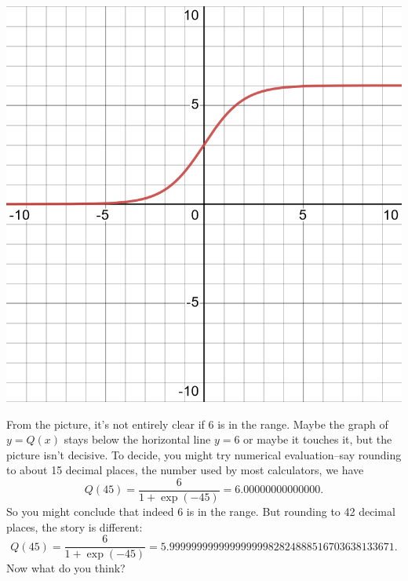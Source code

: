 \documentclass[12pt,fleqn,answers]{exam}
\begin{document}
\begin{questions}
\begin{solution}[3.5in]
\begin{center}
\includegraphics[scale=0.15]{desmos-graph(26).png}
\end{center}
From the picture, it's not entirely clear if $6$ is in the range. Maybe the graph of $y=Q(x)$ stays below the horizontal line
$y=6$ or maybe it touches it, but the picture isn't decisive. To decide, you might try
numerical evaluation--say rounding to about 15 decimal places, the number used
by most calculators, we have
\begin{equation*}
    Q(45) = \frac{6}{1+\exp(-45)} = 6.00000000000000.
\end{equation*}
So you might conclude that indeed $6$ is in the range. But rounding to 42 decimal
places, the story is different:
\begin{equation*}
    Q(45) = \frac{6}{1+\exp(-45)} = 5.99999999999999999982824888516703638133671.
\end{equation*}
Now what do you think?


\end{solution}
\end{questions}
\end{document}
